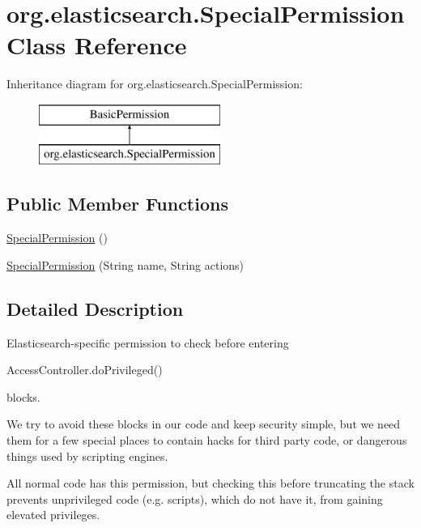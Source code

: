 \hypertarget{classorg_1_1elasticsearch_1_1_special_permission}{}\section{org.\+elasticsearch.\+Special\+Permission Class Reference}
\label{classorg_1_1elasticsearch_1_1_special_permission}
Inheritance diagram for org.\+elasticsearch.\+Special\+Permission\+:\begin{figure}[H]
\begin{center}
\leavevmode
\includegraphics[height=2.000000cm]{classorg_1_1elasticsearch_1_1_special_permission}
\end{center}
\end{figure}
\subsection*{Public Member Functions}
\begin{DoxyCompactItemize}
\item 
\hyperlink{classorg_1_1elasticsearch_1_1_special_permission_ad7d44e1b12cf47115d5f4f0438238c82}{Special\+Permission} ()
\item 
\hyperlink{classorg_1_1elasticsearch_1_1_special_permission_abe8ca62b43aea4849338562577fc037b}{Special\+Permission} (String name, String actions)
\end{DoxyCompactItemize}


\subsection{Detailed Description}
Elasticsearch-\/specific permission to check before entering 
\begin{DoxyCode}
AccessController.doPrivileged() 
\end{DoxyCode}
 blocks. 

We try to avoid these blocks in our code and keep security simple, but we need them for a few special places to contain hacks for third party code, or dangerous things used by scripting engines. 

All normal code has this permission, but checking this before truncating the stack prevents unprivileged code (e.\+g. scripts), which do not have it, from gaining elevated privileges. 

